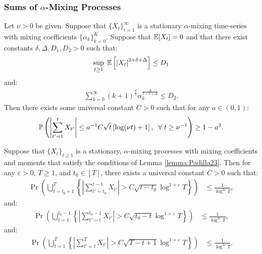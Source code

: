 \subsubsection{Sums of $\alpha$-Mixing Processes}

\begin{lemma}\label{lemma:Padilla23}
Let $\nu > 0$ be given. Suppose that $\{X_t\}_{t=1}^\infty$ is a stationary $\alpha$-mixing time-series with mixing coefficients $\{\alpha_k\}_{k=0}^K$. Suppose that $\mathbb{E}[X_t] = 0$ and that there exist constants $\delta, \Delta, D_1, D_2 > 0$ such that:
\begin{align*}
    \sup_{t \geq 1}\; \mathbb{E}\left[\left|X_t\right|^{2+\delta+\Delta}\right] \leq D_1 
\end{align*}
and:
\begin{align*}
    \sum_{k=0}^\infty (k+1)^{\frac{\delta}{2}} \alpha_k^{\frac{\Delta}{2+\delta+\Delta}} \leq D_2.
\end{align*}
Then there exists some universal constant $C > 0$ such that for any $a \in (0,1)$:
\begin{align*}
    \mathbb{P} \left(\left|\sum_{t'=1}^t X_{t'}\right| \leq a^{-1}C\sqrt{t}\left[\log (\nu t) + 1\right], \;\;\forall\; t\geq \nu^{-1}\right) 
    \geq 1 - a^2.
\end{align*}

\end{lemma}

\begin{lemma}\label{lemma:alpha-mix-sum}
Suppose that $\{X_t\}_{t\geq 1}$ is a stationary, $\alpha$-mixing processes with mixing coefficients and moments that satisfy the conditions of Lemma \ref{lemma:Padilla23}. Then for any $\varepsilon > 0$, $T \geq 1$, and $t_0 \in [T]$, there exists a universal constant $C > 0$ such that:
\begin{align*}
    \Pr \left(\bigcup_{t=t_0 + 1}^{T}\left\{ \left|\sum_{t'=t_0}^{t-1} X_{t'}\right| > C\sqrt{t-t_0}\log^{1+\varepsilon}T\right\}\right) 
    &\leq \frac{1}{\log^{2\varepsilon} T},
\end{align*}
and:
\begin{align*}
    \Pr \left(\bigcup_{t=1}^{t_0-1}\left\{ \left|\sum_{t'=t}^{t_0-1} X_{t'}\right| > C\sqrt{t_0-t}\log^{1+\varepsilon}T\right\}\right) 
    &\leq \frac{1}{\log^{2\varepsilon} T},
\end{align*}
and:
\begin{align*}
    \Pr \left(\bigcup_{t=1}^{T}\left\{ \left|\sum_{t'=t}^{T} X_{t'}\right| > C\sqrt{T-t+1}\log^{1+\varepsilon}T\right\}\right) 
    &\leq \frac{1}{\log^{2\varepsilon} T}.
\end{align*}

\end{lemma}

